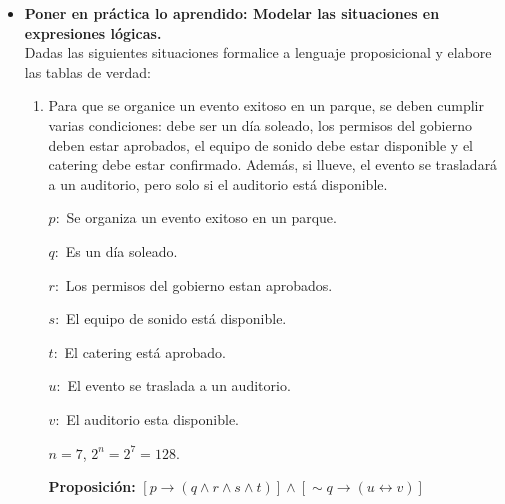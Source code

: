 \documentclass[12pt]{article}
\begin{document}
\begin{itemize}
\begin{enumerate}
                \end{enumerate}
            
            \newpage
            \item \textbf{ Poner en práctica lo aprendido: Modelar las situaciones en expresiones lógicas.}\\ Dadas las siguientes situaciones formalice a lenguaje proposicional y elabore las tablas de verdad: 
            
            \begin{enumerate}
                \item Para que se organice un evento exitoso en un parque, se deben cumplir varias condiciones: debe ser un día soleado, los permisos del gobierno deben estar aprobados, el equipo de sonido debe estar disponible y el catering debe estar confirmado. Además, si llueve, el evento se trasladará a un auditorio, pero solo si el auditorio está disponible.
                    \par$p:$ Se organiza un evento exitoso en un parque.
                    \par$q:$ Es un día soleado.
                    \par$r:$ Los permisos del gobierno estan aprobados.
                    \par$s:$ El equipo de sonido está disponible.
                    \par$t:$ El catering está aprobado.
                    \par$u:$ El evento se traslada a un auditorio.
                    \par$v:$ El auditorio esta disponible.
                    \par$n = 7$, $2^n = 2^7 = 128.$ \vspace{0.5cm}
                    \par\textbf{Proposición: }$[p  \longrightarrow  (q \wedge r \wedge s \wedge t)]  \wedge [\sim q \longrightarrow (u \leftrightarrow v)]$\vspace{0.5cm}


\end{enumerate}
\end{itemize}
\end{document}
